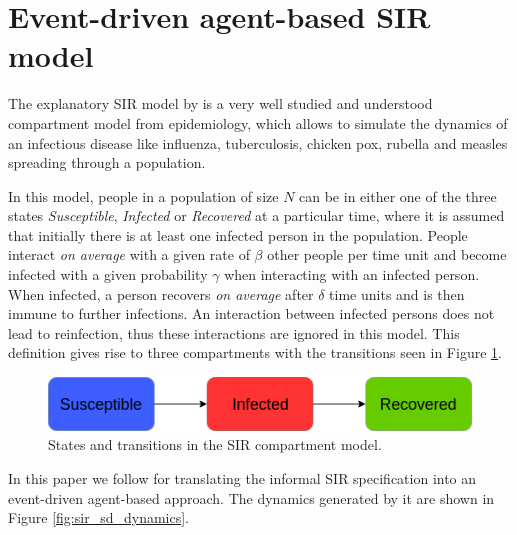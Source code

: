 \section{Event-driven agent-based SIR model}
\label{sec:sirmodel}
The explanatory SIR model by \cite{kermack_contribution_1927} is a very well studied and understood compartment model from epidemiology, which allows to simulate the dynamics of an infectious disease like influenza, tuberculosis, chicken pox, rubella and measles spreading through a population. %

In this model, people in a population of size $N$ can be in either one of the three states \textit{Susceptible}, \textit{Infected} or \textit{Recovered} at a particular time, where it is assumed that initially there is at least one infected person in the population. People interact \textit{on average} with a given rate of $\beta$ other people per time unit and become infected with a given probability $\gamma$ when interacting with an infected person. When infected, a person recovers \textit{on average} after $\delta$ time units and is then immune to further infections. An interaction between infected persons does not lead to reinfection, thus these interactions are ignored in this model. This definition gives rise to three compartments with the transitions seen in Figure \ref{fig:sir_transitions}.

\begin{figure}
	\centering
	\includegraphics[width=.7\textwidth, angle=0]{./fig/SIR_transitions.png}
	\caption{States and transitions in the SIR compartment model.}
	\label{fig:sir_transitions}
\end{figure}

In this paper we follow \cite{macal_agent-based_2010} for translating the informal SIR specification into an event-driven agent-based approach. The dynamics generated by it are shown in Figure \ref{fig:sir_sd_dynamics}. 

